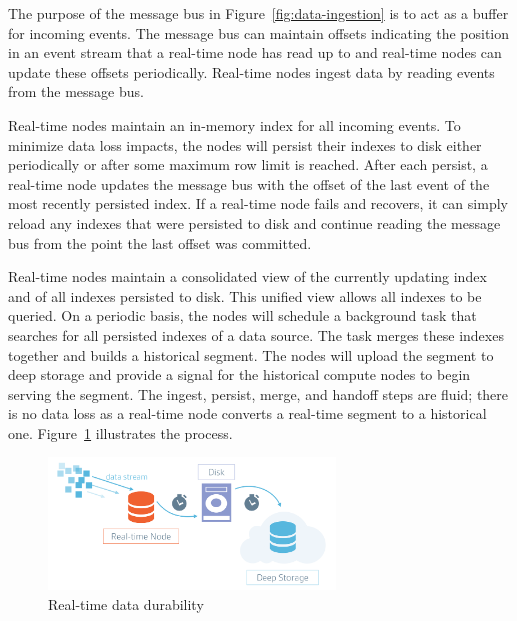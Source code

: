 \documentclass{vldb}
\begin{document}
The purpose of the message bus in Figure~\ref{fig:data-ingestion} is to act as a buffer for
incoming events. The message bus can maintain offsets indicating the
position in an event stream that a real-time node has read up to and
real-time nodes can update these offsets periodically. Real-time nodes
ingest data by reading events from the message bus.

Real-time nodes maintain an in-memory index for all incoming
events. To minimize data loss impacts, the nodes will persist their
indexes to disk either periodically or after some maximum row limit is
reached. After each persist, a real-time node updates the message bus
with the offset of the last event of the most recently persisted
index. If a real-time node fails and recovers, it can simply reload
any indexes that were persisted to disk and continue reading the
message bus from the point the last offset was committed.

Real-time nodes maintain a consolidated view of the currently updating
index and of all indexes persisted to disk. This unified view allows
all indexes to be queried. On a periodic basis, the nodes will
schedule a background task that searches for all persisted indexes of
a data source. The task merges these indexes together and builds a
historical segment. The nodes will upload the segment to deep storage
and provide a signal for the historical compute nodes to begin serving
the segment. The ingest, persist, merge, and handoff steps are fluid;
there is no data loss as a real-time node converts a real-time segment
to a historical one. Figure~\ref{fig:data-durability} illustrates the process.

\begin{figure}
\centering
\includegraphics[width = 3in]{druid_realtime_flow}
\caption{Real-time data durability}
\label{fig:data-durability}
\end{figure}
\end{document}

